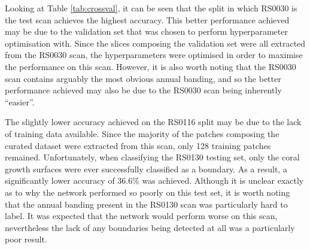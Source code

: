 Looking at Table \ref{tab:crossval}, it can be seen that the split in which RS0030 is the test scan achieves the highest accuracy. This better performance achieved may be due to the validation set that was chosen to perform hyperparameter optimisation with. Since the slices composing the validation set were all extracted from the RS0030 scan, the hyperparameters were optimised in order to maximise the performance on this scan. However, it is also worth noting that the RS0030 scan contains arguably the most obvious annual banding, and so the better performance achieved may also be due to the RS0030 scan being inherently ``easier''.

The slightly lower accuracy achieved on the RS0116 split may be due to the lack of training data available. Since the majority of the patches composing the curated dataset were extracted from this scan, only 128 training patches remained. Unfortunately, when classifying the RS0130 testing set, only the coral growth surfaces were ever successfully classified as a boundary. As a result, a significantly lower accuracy of 36.6\% was achieved. Although it is unclear exactly as to why the network performed so poorly on this test set, it is worth noting that the annual banding present in the RS0130 scan was particularly hard to label. It was expected that the network would perform worse on this scan, nevertheless the lack of any boundaries being detected at all was a particularly poor result.

